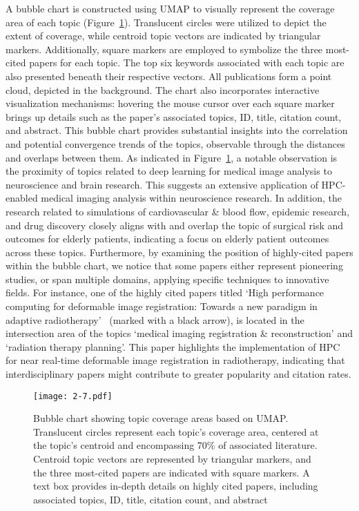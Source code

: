A bubble chart is constructed using UMAP to visually represent the coverage area of each topic (Figure~\ref{fig:2-7}). Translucent circles were utilized to depict the extent of coverage, while centroid topic vectors are indicated by triangular markers. Additionally, square markers are employed to symbolize the three most-cited papers for each topic. The top six keywords associated with each topic are also presented beneath their respective vectors. All publications form a point cloud, depicted in the background. The chart also incorporates interactive visualization mechanisms: hovering the mouse cursor over each square marker brings up details such as the paper's associated topics, ID, title, citation count, and abstract. This bubble chart provides substantial insights into the correlation and potential convergence trends of the topics, observable through the distances and overlaps between them. As indicated in Figure~\ref{fig:2-7}, a notable observation is the proximity of topics related to deep learning for medical image analysis to neuroscience and brain research. This suggests an extensive application of HPC-enabled medical imaging analysis within neuroscience research. In addition, the research related to simulations of cardiovascular \& blood flow, epidemic research, and drug discovery closely aligns with and overlap the topic of surgical risk and outcomes for elderly patients, indicating a focus on elderly patient outcomes across these topics. Furthermore, by examining the position of highly-cited papers within the bubble chart, we notice that some papers either represent pioneering studies, or span multiple domains, applying specific techniques to innovative fields. For instance, one of the highly cited papers titled `High performance computing for deformable image registration: Towards a new paradigm in adaptive radiotherapy'~\cite{samant2008high} (marked with a black arrow), is located in the intersection area of the topics `medical imaging registration \& reconstruction' and `radiation therapy planning'. This paper highlights the implementation of HPC for near real-time deformable image registration in radiotherapy, indicating that interdisciplinary papers might contribute to greater popularity and citation rates.

\begin{figure}[!h]
\centering
\texttt{[image: 2-7.pdf]}
\caption{Bubble chart showing topic coverage areas based on UMAP. Translucent circles represent each topic's coverage area, centered at the topic's centroid and encompassing 70\% of associated literature. Centroid topic vectors are represented by triangular markers, and the three most-cited papers are indicated with square markers. A text box provides in-depth details on highly cited papers, including associated topics, ID, title, citation count, and abstract}
\label{fig:2-7}
\end{figure}

